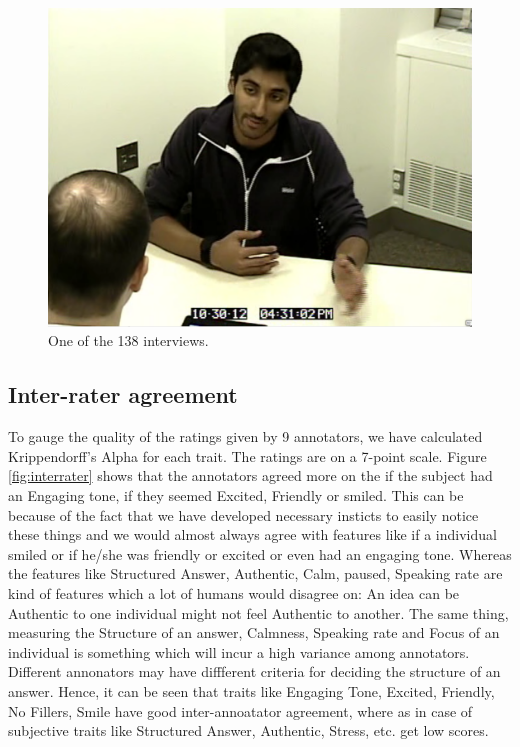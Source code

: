 \documentclass[11pt]{article}
\begin{document}
\begin{figure}[h!]
\begin{center}
\includegraphics[width=0.7\columnwidth]{figures/Screenshot from 2016-10-21 20-30-05/Screenshot from 2016-10-21 20-30-05}
\caption{One of the 138 interviews.}
\label{fig:dataset}
\end{center}
\end{figure}

\subsection{Inter-rater agreement}
To gauge the quality of the ratings given by 9 annotators, we have calculated Krippendorff’s Alpha for each trait. The ratings are on a 7-point scale. Figure \ref{fig:interrater} shows that the annotators agreed more on the if the subject had an Engaging tone, if they seemed Excited, Friendly or smiled. This can be because of the fact that we have developed necessary insticts to easily notice these things and we would almost always agree with features like if a individual smiled or if he/she was friendly or excited or even had an engaging tone. Whereas the features like Structured Answer, Authentic, Calm, paused, Speaking rate are kind of features which a lot of humans would disagree on: An idea can be Authentic to one individual might not feel Authentic to another. The same thing, measuring the Structure of an answer, Calmness, Speaking rate and Focus of an individual is something which will incur a high variance among annotators. Different annonators may have diffferent criteria for deciding the structure of an answer. Hence, it can be seen that traits like Engaging Tone, Excited, Friendly, No Fillers, Smile have good inter-annoatator agreement, where as in case of subjective traits like Structured Answer, Authentic, Stress, etc. get low scores.
\end{document}

